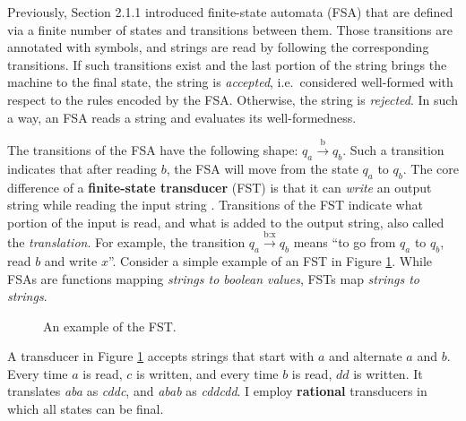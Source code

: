 \bigskip

Previously, Section 2.1.1 introduced finite-state automata (FSA) that are defined via a finite number of states and transitions between them.
Those transitions are annotated with symbols, and strings are read by following the corresponding transitions.
If such transitions exist and the last portion of the string brings the machine to the final state, the string is \emph{accepted}, i.e.\ considered well-formed with respect to the rules encoded by the FSA.
Otherwise, the string is \emph{rejected}.
In such a way, an FSA reads a string and evaluates its well-formedness.

The transitions of the FSA have the following shape: $q_{a}\xrightarrow{\text{b}}q_{b}$.
Such a transition indicates that after reading $b$, the FSA will move from the state $q_{a}$ to $q_{b}$.
The core difference of a \textbf{finite-state transducer} (FST) is that it can \emph{write} an output string while reading the input string \citep{Schuetzenberger1961}.
Transitions of the FST indicate what portion of the input is read, and what is added to the output string, also called the \emph{translation}.
For example, the transition $q_{a}\xrightarrow{\text{b:x}}q_{b}$ means ``to go from $q_{a}$ to $q_{b}$, read $b$ and write $x$''.
Consider a simple example of an FST in Figure \ref{fig:transabcd}.
While FSAs are functions mapping \emph{strings to boolean values}, FSTs map \emph{strings to strings}.


\begin{figure}[h!] 
\centering
{}
\caption{An example of the FST.}
\label{fig:transabcd}
\end{figure}

A transducer in Figure \ref{fig:transabcd} accepts strings that start with $a$ and alternate $a$ and $b$.
Every time $a$ is read, $c$ is written, and every time $b$ is read, $dd$ is written.
It translates \emph{aba} as \emph{cddc}, and \emph{abab} as \emph{cddcdd}.
I employ \textbf{rational} transducers in which all states can be final.



